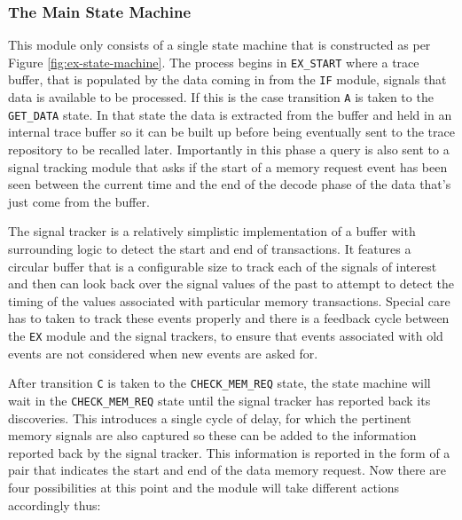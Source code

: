 \subsubsection{The Main State Machine}

This module only consists of a single state machine that is constructed as per Figure \ref{fig:ex-state-machine}. The process begins in \texttt{EX\_START} where a trace buffer, that is populated by the data coming in from the \texttt{IF} module, signals that data is available to be processed. If this is the case transition \texttt{A} is taken to the \texttt{GET\_DATA} state. In that state the data is extracted from the buffer and held in an internal trace buffer so it can be built up before being eventually sent to the trace repository to be recalled later. Importantly in this phase a query is also sent to a signal tracking module that asks if the start of a memory request event has been seen between the current time and the end of the decode phase of the data that's just come from the buffer. 

The signal tracker is a relatively simplistic implementation of a buffer with surrounding logic to detect the start and end of transactions. It features a circular buffer that is a configurable size to track each of the signals of interest and then can look back over the signal values of the past to attempt to detect the timing of the values associated with particular memory transactions. Special care has to taken to track these events properly and there is a feedback cycle between the \texttt{EX} module and the signal trackers, to ensure that events associated with old events are not considered when new events are asked for.

After transition \texttt{C} is taken to the \texttt{CHECK\_MEM\_REQ} state, the state machine will wait in the \texttt{CHECK\_MEM\_REQ} state until the signal tracker has reported back its discoveries. This introduces a single cycle of delay, for which the pertinent memory signals are also captured so these can be added to the information reported back by the signal tracker. This information is reported in the form of a pair that indicates the start and end of the data memory request. Now there are four possibilities at this point and the module will take different actions accordingly thus:

